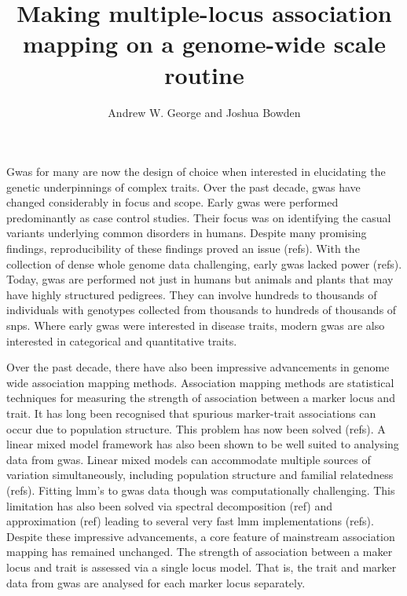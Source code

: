 \documentclass{article}
\begin{document}
\title{Making multiple-locus association mapping on a genome-wide scale routine}
\author{Andrew W. George and Joshua Bowden}

\maketitle




Gwas for many are now the design of choice when interested in elucidating the genetic underpinnings  of complex traits.  Over the past decade, gwas have changed considerably in focus and scope. Early gwas were performed predominantly as case control studies. Their focus was on identifying the casual variants underlying common disorders in humans. Despite many promising findings, reproducibility of these findings proved an issue (refs). With the collection of dense whole genome data challenging, early gwas lacked power (refs).  Today, gwas are performed not just in humans but animals and plants that may have highly structured pedigrees. They can involve hundreds to thousands of individuals with genotypes collected from thousands to hundreds of thousands of snps. Where early gwas were interested in disease traits, modern gwas are also  interested in categorical and quantitative traits.

Over the past decade, there have also been impressive advancements in genome wide association mapping methods. Association mapping methods are statistical techniques for measuring the strength of association between a marker locus and trait. It has long been recognised that spurious marker-trait associations can occur due to population structure. This problem has now been solved (refs). A linear mixed model framework has also been shown to be well suited to analysing data from gwas. Linear mixed models can accommodate multiple sources of variation simultaneously, including population structure and familial relatedness (refs). Fitting lmm's to gwas data though was computationally challenging. This limitation has also been solved via spectral decomposition (ref) and approximation (ref) leading to several very fast lmm implementations (refs). Despite these impressive advancements, a core feature of mainstream  association mapping has remained unchanged. The strength of association between a maker locus and trait is assessed via a single locus model.  That is, the trait and marker data from gwas are analysed for each marker locus separately.
\end{document}

